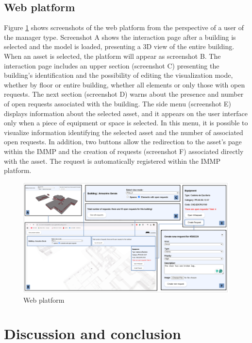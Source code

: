 \documentclass[a4paper, 10pt, twocolumn, twoside]{article}
\begin{document}
\subsection{Web platform}
\label{subsec:platform}

Figure \ref{fig_plataforma} shows screenshots of the web platform from the perspective of a user of the manager type. Screenshot A shows the interaction page after a building is selected and the model is loaded, presenting a 3D view of the entire building. When an asset is selected, the platform will appear as screenshot B. The interaction page includes an upper section (screenshot C) presenting the building's identification and the possibility of editing the visualization mode, whether by floor or entire building, whether all elements or only those with open requests. The next section (screenshot D) warns about the presence and number of open requests associated with the building. The side menu (screenshot E) displays information about the selected asset, and it appears on the user interface only when a piece of equipment or space is selected. In this menu, it is possible to visualize information identifying the selected asset and the number of associated open requests. In addition, two buttons allow the redirection to the asset's page within the IMMP and the creation of requests (screenshot F) associated directly with the asset. The request is automatically registered within the IMMP platform.

\begin{figure}[!htb]
    \centering
    \includegraphics[width=\textwidth]{Images/plataforma.png}
    \caption{Web platform}
    \label{fig_plataforma}
\end{figure}

\section{Discussion and conclusion}
\label{sec:conclusion}
\end{document}
